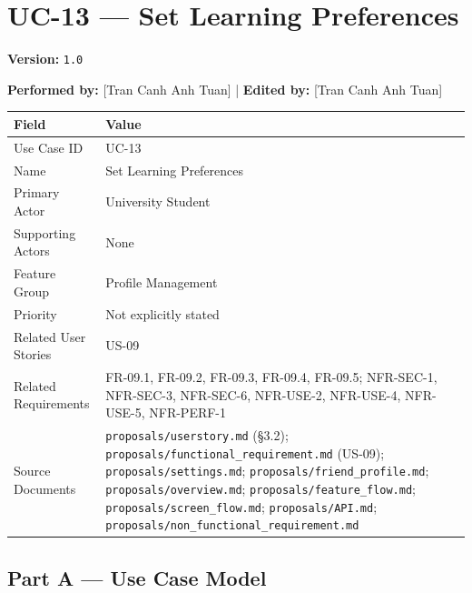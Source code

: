 \documentclass[12pt]{article}
\renewcommand{\baselinestretch}{1.5}
\begin{document}
\pagebreak
\hypertarget{sec:uc-13-set-learning-preferences}{}
\section*{UC-13 --- Set Learning Preferences}
\par\medskip

\textbf{Version:} \texttt{1.0}
\par\medskip

\textbf{Performed by:} [Tran Canh Anh Tuan] | \textbf{Edited by:} [Tran Canh Anh Tuan]
\par\medskip

\begingroup
\small
\renewcommand{\baselinestretch}{1.0}\selectfont
\renewcommand{\arraystretch}{1.15}
\setlength{\tabcolsep}{6pt}
\begin{longtable}{|>{\raggedright\arraybackslash}p{}|>{\raggedright\arraybackslash}p{}|}
\hline
\textbf{Field} & \textbf{Value} \\ \hline
\endhead
Use Case ID & UC-13 \\ \hline
Name & Set Learning Preferences \\ \hline
Primary Actor & University Student \\ \hline
Supporting Actors & None \\ \hline
Feature Group & Profile Management \\ \hline
Priority & Not explicitly stated \\ \hline
Related User Stories & US-09 \\ \hline
Related Requirements & FR-09.1, FR-09.2, FR-09.3, FR-09.4, FR-09.5; NFR-SEC-1, NFR-SEC-3, NFR-SEC-6, NFR-USE-2, NFR-USE-4, NFR-USE-5, NFR-PERF-1 \\ \hline
Source Documents & \texttt{proposals/userstory.md} (§3.2); \texttt{proposals/functional\_requirement.md} (US-09); \texttt{proposals/settings.md}; \texttt{proposals/friend\_profile.md}; \texttt{proposals/overview.md}; \texttt{proposals/feature\_flow.md}; \texttt{proposals/screen\_flow.md}; \texttt{proposals/API.md}; \texttt{proposals/non\_functional\_requirement.md} \\ \hline
\end{longtable}
\endgroup
\par\medskip

\hypertarget{sec:part-a-use-case-model}{}
\subsection*{Part A --- Use Case Model}
\par\medskip
\end{document}
